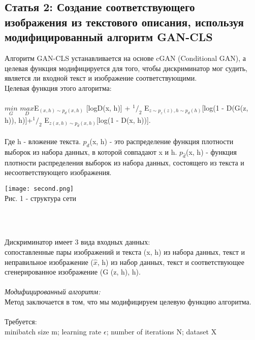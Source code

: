 \documentclass{article}
\begin{document}
    \newpage
    \begin{center} 
    \section{Статья 2: Создание соответствующего изображения из текстового описания, используя модифицированный алгоритм GAN-CLS}
    \end{center} 
    \large 
    Алгоритм GAN-CLS устанавливается на основе cGAN (Conditional GAN), а целевая функция модифицируется для того, чтобы дискриминатор мог судить, является ли входной текст и изображение соответствующими.\\
    Целевая функция этого алгоритма:\\ \\
    $\underset{G}{min}$ $\underset{D}{max}$E$_{(x,h) \sim p_{d}(x,h)}$ [logD(x, h)] + $^1/_2$ E$_{z \sim p_{z}(z),h \sim p_{d}(h)}$[log(1 - D(G(z, h)), h)]+$^1/_2$ E$_{z(x,h) \sim p_{\hat{d}}(x,h)}$[log(1 - D(x, h))].
    \\ \\
    Где h - вложение текста. $p_{d}$(x, h) - это распределение функция плотности выборок из набора данных, в которой совпадают x и h. $p_{\hat{d}}$(x, h) - функция плотности распределения выборок из набора данных, состоящего из текста и несоответствующего изображения.
    \\
    \begin{center} 
    \texttt{[image: second.png]}
    \\
    \caption{Рис. 1 - структура сети}
    \\ \\
    \end{center} 
    Дискриминатор имеет 3 вида входных данных:\\
    сопоставленные пары изображений и текста (x, h) из набора данных, текст и неправильное изображение ($\hat{x}$, h) из набор данных, текст и соответствующее сгенерированное изображение (G (z, h), h).
    \\ \\
    \textit{Модифицированный алгоритм:}\\
    Метод заключается в том, что мы модифицируем целевую функцию алгоритма.
    \\
    \\
    Требуется: \\
    minibatch size m; learning rate $\epsilon$; number of iterations N; dataset X \\
\end{document}
